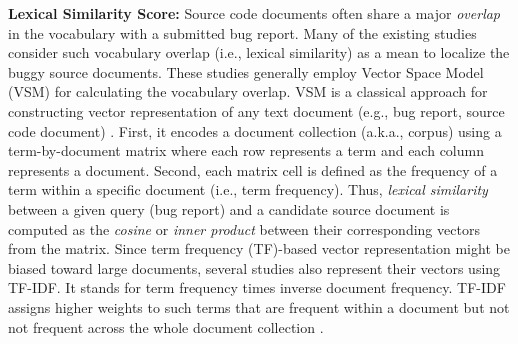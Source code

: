 \documentclass[conference]{IEEEtran}
\begin{document}



\textbf{Lexical Similarity Score:}
Source code documents often share a major \emph{overlap} in the vocabulary with a submitted bug report. Many of the existing studies \cite{Jian,Saha,Saha2,Wang2} consider such vocabulary overlap (i.e., lexical similarity) as a mean to localize the buggy source documents. These studies generally employ Vector Space Model (VSM) \cite{vector-space-model} for calculating the vocabulary overlap. VSM is a classical approach for constructing vector representation of any text document (e.g., bug report, source code document) \cite{vector-space-model}. First, it encodes a document collection (a.k.a., corpus) using a term-by-document matrix where each row represents a term and each column represents a document. Second, each matrix cell is defined as the frequency of a term within a specific document (i.e., term frequency). 
Thus, \emph{lexical similarity} between a given query (bug report) and a candidate source document is computed as the \emph{cosine} or \emph{inner product} between their corresponding vectors from the matrix.
Since term frequency (TF)-based vector representation might be biased toward large documents, several studies \cite{Jian,Saha} also represent their vectors using TF-IDF. It stands for term frequency times inverse document frequency.
TF-IDF assigns higher weights to such terms that are frequent within a document but not not frequent across the whole document collection \cite{Salton}.       
\end{document}
